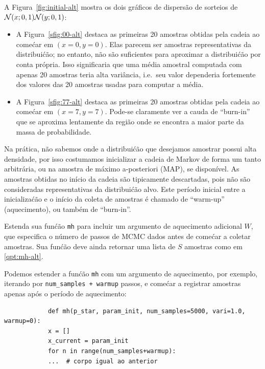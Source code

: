 \begin{exenumerate}
\begin{solution}
        
        A Figura~\ref{fig:initial-alt} mostra os dois gr\'aficos de dispers\~ao de sorteios de $\mathcal{N}(x; 0, 1)\mathcal{N}(y; 0, 1)$:
        \begin{itemize}
            \item A Figura~\ref{sfig:00-alt} destaca as primeiras 20 amostras
            obtidas pela cadeia ao come\'car em $(x=0, y=0)$. Elas
            parecem ser amostras representativas da distribui\'c\~ao;
            no entanto, n\~ao s\~ao suficientes para aproximar a distribui\'c\~ao
            por conta pr\'opria. Isso significaria que uma m\'edia amostral computada
            com apenas 20 amostras teria alta vari\^ancia, i.e.\ seu
            valor dependeria fortemente dos valores das 20 amostras
            usadas para computar a m\'edia.
            \item A Figura~\ref{sfig:77-alt} destaca as primeiras 20 amostras
            obtidas pela cadeia ao come\'car em $(x=7, y=7)$. Pode-se
            claramente ver a cauda de ``burn-in'' que se aproxima lentamente da
            regi\~ao onde se encontra a maior parte da massa de probabilidade.
        \end{itemize}
        
        
    \end{solution}
    
    \item Na pr\'atica, n\~ao sabemos onde a distribui\'c\~ao que desejamos
    amostrar possui alta densidade, por isso costumamos inicializar a
    cadeia de Markov de forma um tanto arbitr\'aria, ou na amostra de m\'aximo a-posteriori (MAP), se
    dispon\'ivel. As amostras obtidas no in\'icio da cadeia s\~ao
    tipicamente descartadas, pois n\~ao s\~ao consideradas representativas
    da distribui\'c\~ao alvo. Este per\'iodo inicial entre a
    inicializa\'c\~ao e o in\'icio da coleta de amostras \'e chamado de
    ``warm-up'' (aquecimento), ou tamb\'em de ``burn-in''.
    
    Estenda sua fun\'c\~ao \lstinline|mh| para incluir um argumento de aquecimento
    adicional $W$, que especifica o n\'umero de passos de MCMC dados antes de
    come\'car a coletar amostras. Sua fun\'c\~ao deve ainda retornar uma lista
    de $S$ amostras como em \ref{qpt:mh-alt}.
    
    \begin{solution}
        
        Podemos estender a fun\'c\~ao \lstinline|mh| com um argumento de aquecimento, por exemplo, iterando por \lstinline|num_samples + warmup|
        passos, e come\'car a registrar amostras apenas ap\'os o per\'iodo de aquecimento:
        \begin{lstlisting}
            def mh(p_star, param_init, num_samples=5000, vari=1.0, warmup=0):
            x = []
            x_current = param_init
            for n in range(num_samples+warmup):
            ...  # corpo igual ao anterior
            

\end{lstlisting}
\end{solution}
\end{exenumerate}
